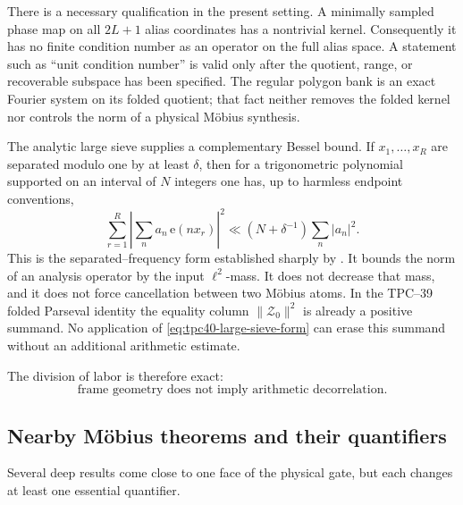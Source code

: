 There is a necessary qualification in the present setting.  A minimally
sampled phase map on all \(2L+1\) alias coordinates has a nontrivial
kernel.  Consequently it has no finite condition number as an operator on
the full alias space.  A statement such as ``unit condition number'' is
valid only after the quotient, range, or recoverable subspace has been
specified.  The regular polygon bank is an exact Fourier system on its
folded quotient; that fact neither removes the folded kernel nor controls
the norm of a physical M\"obius synthesis.

The analytic large sieve supplies a complementary Bessel bound.  If
\(x_1,\ldots,x_R\) are separated modulo one by at least \(\delta\), then
for a trigonometric polynomial supported on an interval of \(N\) integers
one has, up to harmless endpoint conventions,
\begin{equation}
 \sum_{r=1}^{R}
 \left|\sum_n a_n\,\mathrm e(nx_r)\right|^2
 \ll (N+\delta^{-1})\sum_n|a_n|^2.
 \label{eq:tpc40-large-sieve-form}
\end{equation}
This is the separated--frequency form established sharply by
\citet{MontgomeryVaughan1973}.  It bounds the norm of an analysis operator
by the input \(\ell^2\)-mass.  It does not decrease that mass, and it does
not force cancellation between two M\"obius atoms.  In the TPC--39 folded
Parseval identity the equality column \(\|\mathscr Z_0\|^2\) is already a
positive summand.  No application of
\eqref{eq:tpc40-large-sieve-form} can erase this summand without an
additional arithmetic estimate.

The division of labor is therefore exact:
\begin{equation}
 \boxed{\text{frame geometry does not imply arithmetic decorrelation.}}
 \label{eq:tpc40-frame-arithmetic-boundary}
\end{equation}

\subsection{Nearby M\"obius theorems and their quantifiers}

Several deep results come close to one face of the physical gate, but each
changes at least one essential quantifier.

